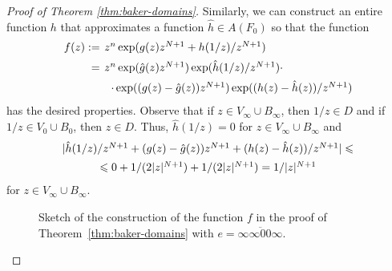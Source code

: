 \documentclass[a4paper, 12pt, reqno]{amsart}
\numberwithin{equation}{section}
\newcommand{\red}[1]{{\color{red} #1}}
\theoremstyle{plain}
\theoremstyle{definition}
\theoremstyle{remark}
\newcommand{\C}{{\mathbb{C}}}
\begin{document}
\begin{proof}[Proof of Theorem \ref{thm:baker-domains}]
Similarly, we can construct an entire function $h$ that approximates a function $\hat{h}\in A(F_0)$ so that the function
$$
\begin{array}{rl}
f(z):=&\hspace{-6pt}z^n\exp(g(z)z^{N+1}+h(1/z)/z^{N+1})\vspace{5pt}\\
=&\hspace{-6pt}z^n\exp(\hat{g}(z)z^{N+1})\exp(\hat{h}(1/z)/z^{N+1}) \cdot \vspace{5pt}\\
&\cdot \exp((g(z)-\hat{g}(z))z^{N+1})\exp((h(z)-\hat{h}(z))/z^{N+1})
\end{array}
$$
has the desired properties. Observe that if $z\in V_\infty\cup B_\infty$, then $1/z\in D$ and if $1/z\in V_0\cup B_0$, then $z\in D$. Thus, $\hat{h}(1/z)=0$ for $z\in V_\infty\cup B_\infty$ and
$$
\begin{array}{c}
|\hat{h}(1/z)/z^{N+1}+(g(z)-\hat{g}(z))z^{N+1}+(h(z)-\hat{h}(z))/z^{N+1}|\leqslant\vspace{5pt}\\
\leqslant 0+1/(2|z|^{N+1})+1/(2|z|^{N+1})=1/|z|^{N+1}
\end{array}
$$
for $z\in V_\infty\cup B_\infty$. %

\begin{figure}[ht!]
\centering
\def\svgwidth{.60\linewidth}

\caption[Sketch of the construction of a transcendental self-map of $\C^*$ that has a cycle of hyperbolic Baker domains II]{Sketch of the construction of the function $f$ in the proof of Theorem~\ref{thm:baker-domains} with $e=\overline{\infty\infty00\infty}$. %
}
\label{fig:sketch-bd-cstar-2sides} 
\end{figure}



\end{proof}
\end{document}
